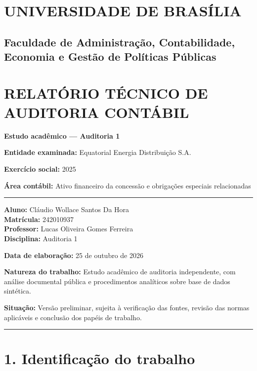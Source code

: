 \documentclass[
]{article}
\author{}
\date{}
\begin{document}
\section{UNIVERSIDADE DE BRASÍLIA}\label{universidade-de-brasuxedlia}

\subsection{Faculdade de Administração, Contabilidade, Economia e Gestão
de Políticas
Públicas}\label{faculdade-de-administrauxe7uxe3o-contabilidade-economia-e-gestuxe3o-de-poluxedticas-puxfablicas}

\section{RELATÓRIO TÉCNICO DE AUDITORIA
CONTÁBIL}\label{relatuxf3rio-tuxe9cnico-de-auditoria-contuxe1bil}

\textbf{Estudo acadêmico --- Auditoria 1}

\textbf{Entidade examinada:} Equatorial Energia Distribuição S.A.

\textbf{Exercício social:} 2025

\textbf{Área contábil:} Ativo financeiro da concessão e obrigações
especiais relacionadas

\begin{center}\rule{0.5\linewidth}{0.5pt}\end{center}

\textbf{Aluno:} Cláudio Wollace Santos Da Hora\\
\textbf{Matrícula:} 242010937\\
\textbf{Professor:} Lucas Oliveira Gomes Ferreira\\
\textbf{Disciplina:} Auditoria 1

\textbf{Data de elaboração:} 25 de outubro de 2026

\textbf{Natureza do trabalho:} Estudo acadêmico de auditoria
independente, com análise documental pública e procedimentos analíticos
sobre base de dados sintética.

\textbf{Situação:} Versão preliminar, sujeita à verificação das fontes,
revisão das normas aplicáveis e conclusão dos papéis de trabalho.

\begin{center}\rule{0.5\linewidth}{0.5pt}\end{center}

\section{1. Identificação do
trabalho}\label{identificauxe7uxe3o-do-trabalho}
\end{document}
